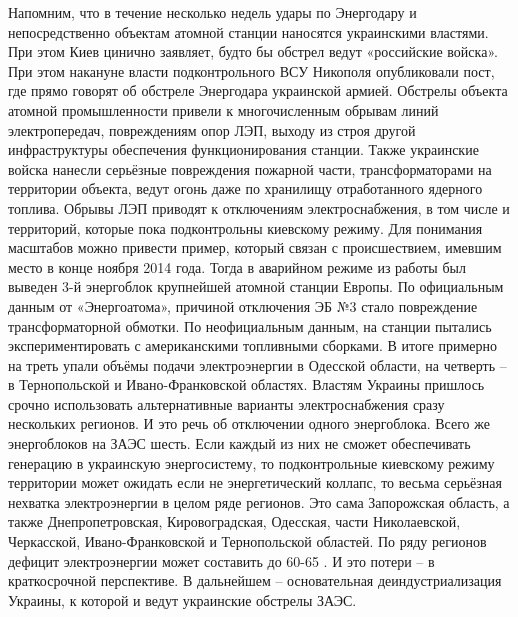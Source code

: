 Напомним, что в течение несколько недель удары по Энергодару и непосредственно объектам атомной станции наносятся украинскими властями. При этом Киев цинично заявляет, будто бы обстрел ведут «российские войска». При этом накануне власти подконтрольного ВСУ Никополя опубликовали пост, где прямо говорят об обстреле Энергодара украинской армией.
Обстрелы объекта атомной промышленности привели к многочисленным обрывам линий электропередач, повреждениям опор ЛЭП, выходу из строя другой инфраструктуры обеспечения функционирования станции. Также украинские войска нанесли серьёзные повреждения пожарной части, трансформаторами на территории объекта, ведут огонь даже по хранилищу отработанного ядерного топлива.
Обрывы ЛЭП приводят к отключениям электроснабжения, в том числе и территорий, которые пока подконтрольны киевскому режиму.
Для понимания масштабов можно привести пример, который связан с происшествием, имевшим место в конце ноября 2014 года. Тогда в аварийном режиме из работы был выведен 3-й энергоблок крупнейшей атомной станции Европы. По официальным данным от «Энергоатома», причиной отключения ЭБ №3 стало повреждение трансформаторной обмотки. По неофициальным данным, на станции пытались экспериментировать с американскими топливными сборками. В итоге примерно на треть упали объёмы подачи электроэнергии в Одесской области, на четверть – в Тернопольской и Ивано-Франковской областях. Властям Украины пришлось срочно использовать альтернативные варианты электроснабжения сразу нескольких регионов. И это речь об отключении одного энергоблока. Всего же энергоблоков на ЗАЭС шесть.
Если каждый из них не сможет обеспечивать генерацию в украинскую энергосистему, то подконтрольные киевскому режиму территории может ожидать если не энергетический коллапс, то весьма серьёзная нехватка электроэнергии в целом ряде регионов. Это сама Запорожская область, а также Днепропетровская, Кировоградская, Одесская, части Николаевской, Черкасской, Ивано-Франковской и Тернопольской областей. По ряду регионов дефицит электроэнергии может составить до 60-65%
. И это потери – в краткосрочной перспективе. В дальнейшем – основательная деиндустриализация Украины, к которой и ведут украинские обстрелы ЗАЭС.


